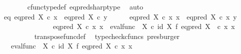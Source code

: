 \begin{isabellebody}
\ \ \ \ \ \ \isamarkupfalse%
\ cfunc{\isacharunderscore}{\kern0pt}type{\isacharunderscore}{\kern0pt}def\ eq{\isacharunderscore}{\kern0pt}pred{\isacharunderscore}{\kern0pt}sharp{\isacharunderscore}{\kern0pt}type\ \isamarkupfalse%
\ auto\isanewline
\ \ \ \ \isamarkupfalse%
\ eq{\isacharcolon}{\kern0pt}\ {\isachardoublequoteopen}eq{\isacharunderscore}{\kern0pt}pred\ X\isactrlsup {\isasymsharp}\ {\isasymcirc}\isactrlsub c\ x\ {\isacharequal}{\kern0pt}\ eq{\isacharunderscore}{\kern0pt}pred\ X\isactrlsup {\isasymsharp}\ {\isasymcirc}\isactrlsub c\ y{\isachardoublequoteclose}\isanewline
\ \ \ \ \isamarkupfalse%
\ {\isachardoublequoteopen}eq{\isacharunderscore}{\kern0pt}pred\ X\ {\isasymcirc}\isactrlsub c\ {\isasymlangle}x{\isacharcomma}{\kern0pt}\ x{\isasymrangle}\ {\isacharequal}{\kern0pt}\ eq{\isacharunderscore}{\kern0pt}pred\ X\ {\isasymcirc}\isactrlsub c\ {\isasymlangle}x{\isacharcomma}{\kern0pt}\ y{\isasymrangle}{\isachardoublequoteclose}\isanewline
\ \ \ \ \isamarkupfalse%
\ {\isacharminus}{\kern0pt}\ \isanewline
\ \ \ \ \ \ \isamarkupfalse%
\ {\isachardoublequoteopen}eq{\isacharunderscore}{\kern0pt}pred\ X\ {\isasymcirc}\isactrlsub c\ {\isasymlangle}x{\isacharcomma}{\kern0pt}\ x{\isasymrangle}\ {\isacharequal}{\kern0pt}\ {\isacharparenleft}{\kern0pt}{\isacharparenleft}{\kern0pt}eval{\isacharunderscore}{\kern0pt}func\ {\isasymOmega}\ X{\isacharparenright}{\kern0pt}\ {\isasymcirc}\isactrlsub c\ {\isacharparenleft}{\kern0pt}id\ X\ {\isasymtimes}\isactrlsub f\ {\isacharparenleft}{\kern0pt}eq{\isacharunderscore}{\kern0pt}pred\ X\isactrlsup {\isasymsharp}{\isacharparenright}{\kern0pt}{\isacharparenright}{\kern0pt}\ {\isacharparenright}{\kern0pt}\ {\isasymcirc}\isactrlsub c\ {\isasymlangle}x{\isacharcomma}{\kern0pt}\ x{\isasymrangle}{\isachardoublequoteclose}\isanewline
\ \ \ \ \ \ \ \ \isamarkupfalse%
\ transpose{\isacharunderscore}{\kern0pt}func{\isacharunderscore}{\kern0pt}def\ \isamarkupfalse%
\ {\isacharparenleft}{\kern0pt}typecheck{\isacharunderscore}{\kern0pt}cfuncs{\isacharcomma}{\kern0pt}\ presburger{\isacharparenright}{\kern0pt}\isanewline
\ \ \ \ \ \ \isamarkupfalse%
\ \isamarkupfalse%
\ {\isachardoublequoteopen}{\isachardot}{\kern0pt}{\isachardot}{\kern0pt}{\isachardot}{\kern0pt}\ {\isacharequal}{\kern0pt}\ {\isacharparenleft}{\kern0pt}eval{\isacharunderscore}{\kern0pt}func\ {\isasymOmega}\ X{\isacharparenright}{\kern0pt}\ {\isasymcirc}\isactrlsub c\ {\isacharparenleft}{\kern0pt}id\ X\ {\isasymtimes}\isactrlsub f\ {\isacharparenleft}{\kern0pt}eq{\isacharunderscore}{\kern0pt}pred\ X\isactrlsup {\isasymsharp}{\isacharparenright}{\kern0pt}{\isacharparenright}{\kern0pt}\ {\isasymcirc}\isactrlsub c\ {\isasymlangle}x{\isacharcomma}{\kern0pt}\ x{\isasymrangle}{\isachardoublequoteclose}\isanewline

\end{isabellebody}
